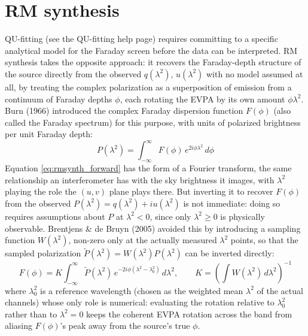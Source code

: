 \section{RM synthesis}
QU-fitting (see the QU-fitting help page) requires committing to a specific analytical model for the Faraday screen before the data can be interpreted. RM synthesis takes the opposite approach: it recovers the Faraday-depth structure of the source directly from the observed $q(\lambda^2)$, $u(\lambda^2)$ with no model assumed at all, by treating the complex polarization as a superposition of emission from a continuum of Faraday depths $\phi$, each rotating the EVPA by its own amount $\phi\lambda^2$. Burn (1966) introduced the complex Faraday dispersion function $F(\phi)$ (also called the Faraday spectrum) for this purpose, with units of polarized brightness per unit Faraday depth:
\begin{equation}\label{eq:rmsynth_forward}
    \displaystyle P(\lambda^2) = \int_{-\infty}^{\infty} F(\phi)\,e^{2i\phi\lambda^2}\,d\phi
\end{equation}
Equation \ref{eq:rmsynth_forward} has the form of a Fourier transform, the same relationship an interferometer has with the sky brightness it images, with $\lambda^2$ playing the role the $(u,v)$ plane plays there. But inverting it to recover $F(\phi)$ from the observed $P(\lambda^2)=q(\lambda^2)+iu(\lambda^2)$ is not immediate: doing so requires assumptions about $P$ at $\lambda^2<0$, since only $\lambda^2\geq0$ is physically observable. Brentjens \& de Bruyn (2005) avoided this by introducing a sampling function $W(\lambda^2)$, non-zero only at the actually measured $\lambda^2$ points, so that the sampled polarization $\tilde P(\lambda^2)=W(\lambda^2)P(\lambda^2)$ can be inverted directly:
\begin{equation}\label{eq:rmsynth_inverse}
    \displaystyle F(\phi) = K\int_{-\infty}^{\infty} \tilde P(\lambda^2)\,e^{-2i\phi(\lambda^2-\lambda_0^2)}\,d\lambda^2, \qquad K=\left(\int W(\lambda^2)\,d\lambda^2\right)^{-1}
\end{equation}
where $\lambda_0^2$ is a reference wavelength (chosen as the weighted mean $\lambda^2$ of the actual channels) whose only role is numerical: evaluating the rotation relative to $\lambda_0^2$ rather than to $\lambda^2=0$ keeps the coherent EVPA rotation across the band from aliasing $F(\phi)$'s peak away from the source's true $\phi$.
\\

